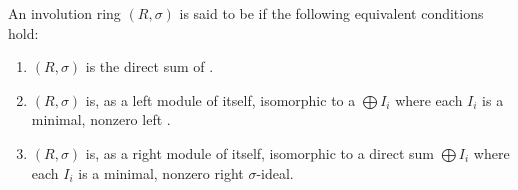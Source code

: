 \begin{definition} \label{definition:semisimple_involution_ring}
    An involution ring $(R,\sigma)$ is said to be  if the following equivalent conditions hold:
    \begin{enumerate}
        \item $(R,\sigma)$ is the direct sum of .

        \item $(R,\sigma)$ is, as a left module of itself, isomorphic to a  $\bigoplus I_i$ where each $I_i$ is a minimal, nonzero left . 

        \item $(R,\sigma)$ is, as a right module of itself, isomorphic to a direct sum $\bigoplus I_i$ where each $I_i$ is a minimal, nonzero right $\sigma$-ideal. 
    \end{enumerate}
\end{definition}